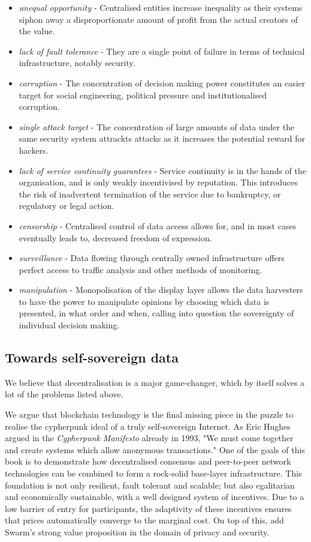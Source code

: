 \begin{itemize}
    \item \emph{unequal opportunity} - Centralised entities increase inequality as their systems siphon away a disproportionate amount of profit from the actual creators of the value.
    \item \emph{lack of fault tolerance} - They are a single point of failure in terms of technical infrastructure, notably security.
    \item \emph{corruption} - The concentration of decision making power constitutes an easier target for social engineering, political pressure and institutionalised corruption.
    \item \emph{single attack target} - The concentration of large amounts of data under the same security system attrackts attacks as it increases the potential reward for hackers. 
    \item \emph{lack of service continuity guarantees} - Service continuity is in the hands of the organisation, and is only weakly incentivised by reputation. This introduces the risk of inadvertent termination of the service due to bankruptcy, or regulatory or legal action.
    \item \emph{censorship} - Centralised control of data access allows for, and in most cases eventually leads to, decreased freedom of expression.
    \item \emph{surveillance} - Data flowing through centrally owned infrastructure offers perfect access to traffic analysis and other methods of monitoring.
    \item \emph{manipulation} - Monopolisation of the display layer allows the data harvesters to have the power to manipulate opinions by choosing which data is presented, in what order and when, calling into question the sovereignty of individual decision making.
\end{itemize}


\subsection{Towards self-sovereign data \statusgreen} \label{sec:selfsovereigndata}

We believe that decentralisation is a major game-changer, which by itself solves a lot of the problems listed above.

We argue that blockchain technology is the final missing piece in the puzzle to realise the cypherpunk ideal of a truly self-sovereign Internet. As Eric Hughes argued in the \emph{Cypherpunk Manifesto} \cite{hughes1993} already in 1993, "We must come together and create systems which allow anonymous transactions." One of the goals of this book is to demonstrate how decentralised consensus and peer-to-peer network technologies can be combined to form a rock-solid base-layer infrastructure. This foundation is not only resilient, fault tolerant and scalable; but also egalitarian and economically sustainable, with a well designed system of incentives. Due to a low barrier of entry for participants, the adaptivity of these incentives ensures that prices automatically converge to the marginal cost. On top of this, add Swarm's strong value proposition in the domain of privacy and security.

